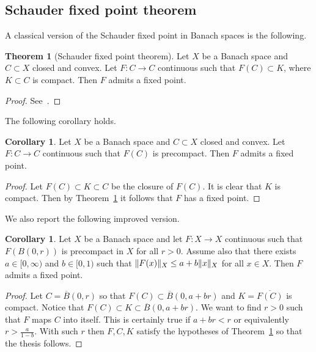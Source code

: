\documentclass[a4paper,10pt,oneside]{amsbook}
\numberwithin{section}{chapter}
\numberwithin{equation}{chapter}
\theoremstyle{definition}
\newtheorem{thm}[prop]{Theorem}
\newtheorem{cor}[prop]{Corollary}
\DeclarePairedDelimiter{\norm}{\lVert}{\rVert}
\begin{document}
%

\subsection{Schauder fixed point theorem}

A classical version of the Schauder fixed point in Banach spaces is the following.
\begin{thm}[Schauder fixed point theorem]
\label{thm:schauder}
Let $X$ be a Banach space and $C\subset X$ closed and convex. Let $F\colon C\to C$ continuous such that $F(C)\subset K$, where $K\subset C$ is compact. Then $F$ admits a fixed point.
\end{thm}
\begin{proof}
See~\cite{niremberg}.
\end{proof}
The following corollary holds.
\begin{cor}
\label{cor:schauder}
Let $X$ be a Banach space and $C\subset X$ closed and convex. Let $F\colon C\to C$ continuous such that $F(C)$ is precompact. Then $F$ admits a fixed point.
\end{cor}
\begin{proof}
Let $F(C)\subset K\subset C$ be the closure of $F(C)$. It is clear that $K$ is compact. Then by Theorem~\ref{thm:schauder} it follows that $F$ has a fixed point.
\end{proof}
We also report the following improved version.
\begin{cor}
\label{cor:schauder-improved}
Let $X$ be a Banach space and let $F\colon X\to X$ continuous such that $F(B(0,r))$ is precompact in $X$ for all $r>0$. Assume also that there exists $a\in[0,\infty)$ and $b\in[0,1)$ such that $\norm{F(x)}_X\le a+b\norm{x}_X$ for all $x\in X$. Then $F$ admits a fixed point.
\end{cor}
\begin{proof}
Let $C=\overline{B}(0,r)$ so that $F(C)\subset\overline{B}(0,a+br)$ and $K=\overline{F(C)}$ is compact. Notice that $F(C)\subset K\subset\overline{B}(0,a+br)$. We want to find $r>0$ such that $F$ maps $C$ into itself. This is certainly true if $a+br<r$ or equivalently $r>\frac{a}{1-b}$. With such $r$ then $F,C,K$ satisfy the hypotheses of Theorem~\ref{thm:schauder} so that the thesis follows.
\end{proof}
\end{document}
